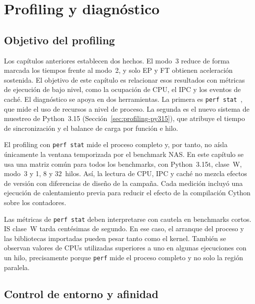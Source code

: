 \chapter{Profiling y diagnóstico}
\label{chap:profiling}

\section{Objetivo del profiling}
\label{sec:profiling-objetivo}

Los capítulos anteriores establecen dos hechos. El modo~3 reduce de forma
marcada los tiempos frente al modo~2, y solo EP y FT obtienen aceleración
sostenida. El objetivo de este capítulo es relacionar esos resultados con
métricas de ejecución de bajo nivel, como la ocupación de CPU, el IPC y los
eventos de caché. El diagnóstico se apoya en dos herramientas. La primera es
\texttt{perf stat}~\cite{LinuxPerfStat}, que mide el uso de recursos a nivel de
proceso. La segunda es el nuevo sistema de muestreo de Python~3.15
(Sección~\ref{sec:profiling-py315}), que atribuye el tiempo de sincronización y
el balance de carga por función e hilo.

El profiling con \texttt{perf stat} mide el proceso completo y, por tanto, no
aísla únicamente la ventana temporizada por el benchmark NAS. En este capítulo se
usa una matriz común para todos los benchmarks, con Python~3.15t, clase~W, modo~3 y
1, 8 y 32~hilos. Así, la lectura de CPU, IPC y caché no mezcla efectos de versión
con diferencias de diseño de la campaña. Cada medición incluyó una ejecución de
calentamiento previa para reducir el efecto de la compilación Cython sobre los
contadores.

Las métricas de \texttt{perf stat} deben interpretarse con cautela en
benchmarks cortos. IS clase~W tarda centésimas de segundo. En ese caso, el
arranque del proceso y las bibliotecas importadas pueden pesar tanto como el
kernel. También se observan valores de CPUs utilizadas superiores a uno en
algunas ejecuciones con un hilo, precisamente porque \texttt{perf} mide el
proceso completo y no solo la región paralela.


\section{Control de entorno y afinidad}
\label{sec:profiling-afinidad}


